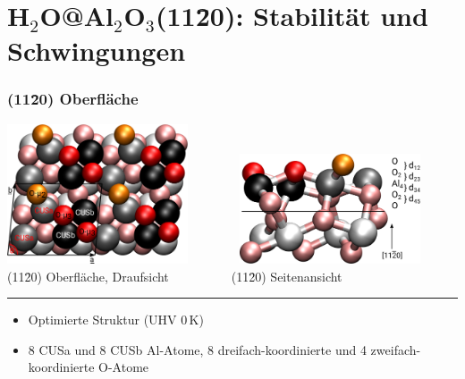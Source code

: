 \documentclass[hyperref={pdfpagelabels=false}]{beamer}
\begin{document}
\section{H$_2$O@Al$_2$O$_3$(11\=20): Stabilität und Schwingungen~ ~ ~ ~ ~ ~ ~ ~ ~ ~}
\begin{frame}
 \frametitle{(11\=20) Oberfläche}
\includegraphics[width=0.4\textwidth]{figures/supercell_opt.png}~ ~ ~ ~ ~
\includegraphics[width=0.4\textwidth]{figures/uc_opt.png}\\
(11\=20) Oberfläche, Draufsicht~ ~ ~~~~~~ (11\=20) Seitenansicht
\newline
 \hrule
 \begin{itemize}
  \item Optimierte Struktur (UHV $0\,$K)
  \item 8 CUSa und 8 CUSb Al-Atome, 8 dreifach-koordinierte und 4 zweifach-koordinierte O-Atome
 \end{itemize}
 \end{frame}
\end{document}
